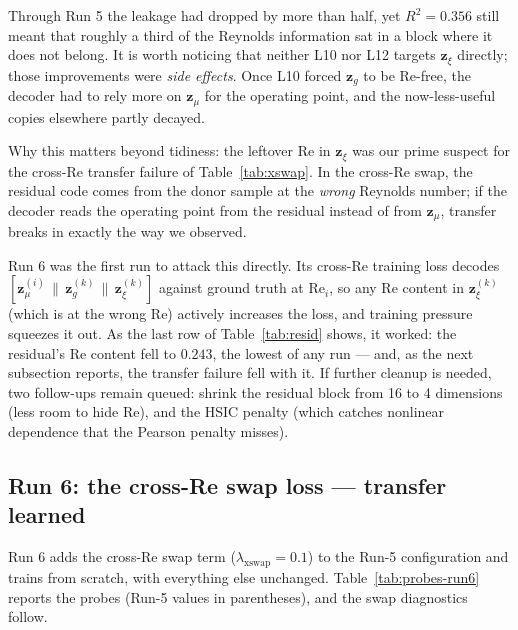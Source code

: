 \documentclass[11pt]{article}
\begin{document}
Through Run 5 the leakage had dropped by more than half, yet $R^2 =
0.356$ still meant that roughly a third of the Reynolds information sat
in a block where it does not belong. It is worth noticing that neither
L10 nor L12 targets $\boldsymbol{z}_{\xi}$ directly; those improvements
were \emph{side effects}. Once L10 forced $\boldsymbol{z}_{g}$ to be
Re-free, the decoder had to rely more on $\boldsymbol{z}_{\mu}$ for the
operating point, and the now-less-useful copies elsewhere partly decayed.

Why this matters beyond tidiness: the leftover Re in
$\boldsymbol{z}_{\xi}$ was our prime suspect for the cross-Re transfer
failure of Table~\ref{tab:xswap}. In the cross-Re swap, the residual code
comes from the donor sample at the \emph{wrong} Reynolds number; if the
decoder reads the operating point from the residual instead of from
$\boldsymbol{z}_{\mu}$, transfer breaks in exactly the way we observed.

Run 6 was the first run to attack this directly. Its cross-Re training
loss decodes $[\boldsymbol{z}_{\mu}^{(i)} \,\|\, \boldsymbol{z}_{g}^{(k)}
\,\|\, \boldsymbol{z}_{\xi}^{(k)}]$ against ground truth at
$\mathrm{Re}_i$, so any Re content in $\boldsymbol{z}_{\xi}^{(k)}$
(which is at the wrong Re) actively increases the loss, and training
pressure squeezes it out. As the last row of Table~\ref{tab:resid}
shows, it worked: the residual's Re content fell to $0.243$, the lowest
of any run --- and, as the next subsection reports, the transfer failure
fell with it. If further cleanup is needed, two follow-ups remain
queued: shrink the residual block from 16 to 4 dimensions (less room to
hide Re), and the HSIC penalty (which catches nonlinear dependence that
the Pearson penalty misses).

\subsection{Run 6: the cross-Re swap loss --- transfer learned}

Run 6 adds the cross-Re swap term ($\lambda_{\mathrm{xswap}} = 0.1$) to
the Run-5 configuration and trains from scratch, with everything else
unchanged. Table~\ref{tab:probes-run6} reports the probes (Run-5 values
in parentheses), and the swap diagnostics follow.
\end{document}
